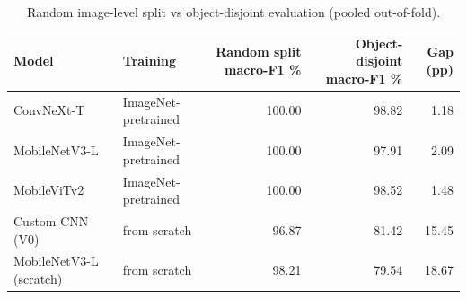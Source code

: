 \begin{table}
\caption{Random image-level split vs object-disjoint evaluation (pooled out-of-fold).}
\label{tab:table_leakage}
\begin{tabular}{llrrr}
\toprule
Model & Training & Random split macro-F1 \% & Object-disjoint macro-F1 \% & Gap (pp) \\
\midrule
ConvNeXt-T & ImageNet-pretrained & 100.00 & 98.82 & 1.18 \\
MobileNetV3-L & ImageNet-pretrained & 100.00 & 97.91 & 2.09 \\
MobileViTv2 & ImageNet-pretrained & 100.00 & 98.52 & 1.48 \\
Custom CNN (V0) & from scratch & 96.87 & 81.42 & 15.45 \\
MobileNetV3-L (scratch) & from scratch & 98.21 & 79.54 & 18.67 \\
\bottomrule
\end{tabular}
\end{table}

